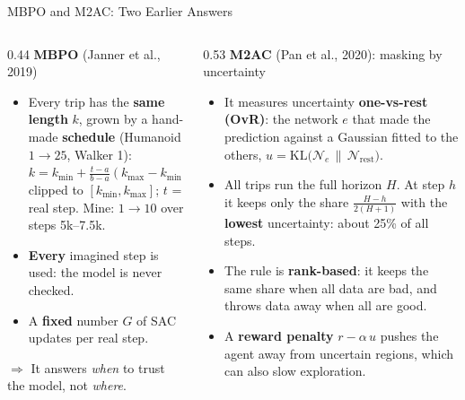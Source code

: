 \documentclass[aspectratio=169,10pt]{beamer}
\begin{document}
\begin{frame}{MBPO and M2AC: Two Earlier Answers}
  \begin{columns}[T]
    \begin{column}{0.44\textwidth}
      \textbf{MBPO} (Janner et al., 2019)
      \begin{itemize}\small
        \item Every trip has the \textbf{same length} $k$, grown by a hand-made \textbf{schedule} (Humanoid $1\to25$,
              Walker 1):\\[0.2em]
              $k=k_{\min}+\frac{t-a}{b-a}(k_{\max}-k_{\min})$\\[0.1em]
              {\footnotesize clipped to $[k_{\min},k_{\max}]$; $t$ = real step. Mine: $1\to10$ over steps 5k--7.5k.}
        \item \textbf{Every} imagined step is used: the model is never checked.
        \item A \textbf{fixed} number $G$ of SAC updates per real step.
      \end{itemize}
      $\Rightarrow$ It answers \emph{when} to trust the model, not \emph{where}.
    \end{column}
    \begin{column}{0.53\textwidth}
      \textbf{M2AC} (Pan et al., 2020): masking by uncertainty
      \begin{itemize}\small
        \item It measures uncertainty \textbf{one-vs-rest (OvR)}: the network $e$ that made the prediction against a
              Gaussian fitted to the others, $u=\mathrm{KL}\big(\mathcal{N}_e\,\|\,\mathcal{N}_{\mathrm{rest}}\big)$.
        \item All trips run the full horizon $H$. At step $h$ it keeps only the share $\frac{H-h}{2(H+1)}$ with the
              \textbf{lowest} uncertainty: about 25\% of all steps.
        \item The rule is \textbf{rank-based}: it keeps the same share when all data are bad, and throws data away
              when all are good.
        \item A \textbf{reward penalty} $r-\alpha\,u$ pushes the agent away from uncertain regions, which can also
              slow exploration.
      \end{itemize}
    \end{column}
  \end{columns}
\end{frame}
\end{document}
